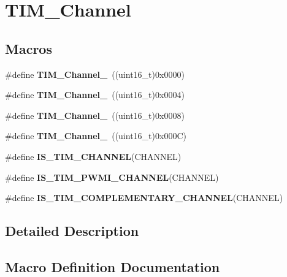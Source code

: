\hypertarget{group___t_i_m___channel}{}\section{T\+I\+M\+\_\+\+Channel}
\label{group___t_i_m___channel}
\subsection*{Macros}
\begin{DoxyCompactItemize}
\item 
\#define {\bfseries T\+I\+M\+\_\+\+Channel\+\_}~((uint16\+\_\+t)0x0000)\hypertarget{group___t_i_m___channel_ga69ea7f558f02c63dd1082d784d2449bd}{}\label{group___t_i_m___channel_ga69ea7f558f02c63dd1082d784d2449bd}

\item 
\#define {\bfseries T\+I\+M\+\_\+\+Channel\+\_}~((uint16\+\_\+t)0x0004)\hypertarget{group___t_i_m___channel_ga03d7da8269a87a560f68985b4bd80931}{}\label{group___t_i_m___channel_ga03d7da8269a87a560f68985b4bd80931}

\item 
\#define {\bfseries T\+I\+M\+\_\+\+Channel\+\_}~((uint16\+\_\+t)0x0008)\hypertarget{group___t_i_m___channel_ga012711b19e8c91f6f352801a3dc0bcc9}{}\label{group___t_i_m___channel_ga012711b19e8c91f6f352801a3dc0bcc9}

\item 
\#define {\bfseries T\+I\+M\+\_\+\+Channel\+\_}~((uint16\+\_\+t)0x000\+C)\hypertarget{group___t_i_m___channel_ga7414888c40d066af235bc1f80b99bd9d}{}\label{group___t_i_m___channel_ga7414888c40d066af235bc1f80b99bd9d}

\item 
\#define {\bfseries I\+S\+\_\+\+T\+I\+M\+\_\+\+C\+H\+A\+N\+N\+EL}(C\+H\+A\+N\+N\+EL)
\item 
\#define {\bfseries I\+S\+\_\+\+T\+I\+M\+\_\+\+P\+W\+M\+I\+\_\+\+C\+H\+A\+N\+N\+EL}(C\+H\+A\+N\+N\+EL)
\item 
\#define {\bfseries I\+S\+\_\+\+T\+I\+M\+\_\+\+C\+O\+M\+P\+L\+E\+M\+E\+N\+T\+A\+R\+Y\+\_\+\+C\+H\+A\+N\+N\+EL}(C\+H\+A\+N\+N\+EL)
\end{DoxyCompactItemize}


\subsection{Detailed Description}


\subsection{Macro Definition Documentation}
